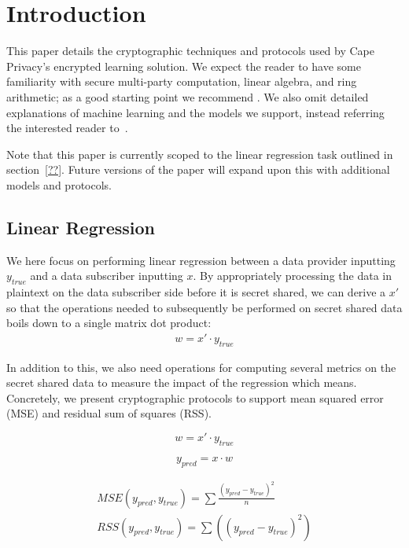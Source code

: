 
\section{Introduction}

This paper details the cryptographic techniques and protocols used by Cape Privacy's encrypted learning solution. We expect the reader to have some familiarity with secure multi-party computation, linear algebra, and ring arithmetic; as a good starting point we recommend \cite{evans2017pragmatic}. We also omit detailed explanations of machine learning and the models we support, instead referring the interested reader to~\cite{??}.

Note that this paper is currently scoped to the linear regression task outlined in section~\ref{??}. Future versions of the paper will expand upon this with additional models and protocols.


\subsection{Linear Regression}

We here focus on performing linear regression between a data provider inputting $y_{\mathit{true}}$ and a data subscriber inputting $x$. By appropriately processing the data in plaintext on the data subscriber side before it is secret shared, we can derive a $x'$ so that the operations needed to subsequently be performed on secret shared data boils down to a single matrix dot product:
\begin{align*}
w = x' \cdot y_{\mathit{true}}
\end{align*}

In addition to this, we also need operations for computing several metrics on the secret shared data to measure the impact of the regression which means. Concretely, we present cryptographic protocols to support mean squared error (MSE) and residual sum of squares (RSS).

$$
w = x' \cdot y_{\mathit{true}}
$$

$$
y_{\mathit{pred}} = x \cdot w
$$

\begin{align*}
\mathit{MSE}(y_{\mathit{pred}}, y_{\mathit{true}}) = \sum \frac{ (y_{\mathit{pred}} - y_{\mathit{true}})^2 }{n}
\\
\mathit{RSS}(y_{\mathit{pred}}, y_{\mathit{true}}) = \sum \left( (y_{\mathit{pred}} - y_{\mathit{true}})^2 \right)
\end{align*}

